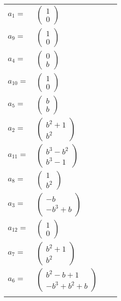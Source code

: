 \documentclass[1p]{elsarticle_modified}
\theoremstyle{definition}
\begin{document}
\begin{tabular}{m{7pt} m{180pt} m{7pt} m{180pt} }
\flushright $a_{1}=$&$\begin{pmatrix}1\\0\end{pmatrix}$ \\
\flushright $a_{9}=$&$\begin{pmatrix}1\\0\end{pmatrix}$ \\
\flushright $a_{4}=$&$\begin{pmatrix}0\\b\end{pmatrix}$ \\
\flushright $a_{10}=$&$\begin{pmatrix}1\\0\end{pmatrix}$ \\
\flushright $a_{5}=$&$\begin{pmatrix}b\\b\end{pmatrix}$ \\
\flushright $a_{2}=$&$\begin{pmatrix}b^2+1\\b^2\end{pmatrix}$ \\
\flushright $a_{11}=$&$\begin{pmatrix}b^3- b^2\\b^3-1\end{pmatrix}$ \\
\flushright $a_{8}=$&$\begin{pmatrix}1\\b^2\end{pmatrix}$ \\
\flushright $a_{3}=$&$\begin{pmatrix}- b\\- b^3+b\end{pmatrix}$ \\
\flushright $a_{12}=$&$\begin{pmatrix}1\\0\end{pmatrix}$ \\
\flushright $a_{7}=$&$\begin{pmatrix}b^2+1\\b^2\end{pmatrix}$ \\
\flushright $a_{6}=$&$\begin{pmatrix}b^2- b+1\\- b^3+b^2+b\end{pmatrix}$\\&\end{tabular}
\end{document}
